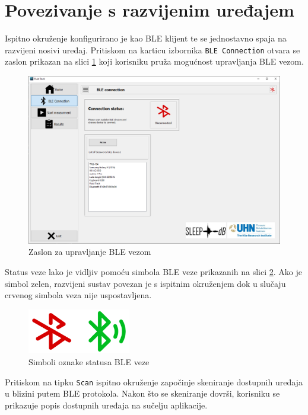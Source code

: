 \documentclass[../diplomski_rad.tex]{subfiles}
\begin{document}
\section{Povezivanje s razvijenim uređajem}

Ispitno okruženje konfigurirano je kao BLE klijent te se jednostavno spaja na razvijeni nosivi uređaj. 
Pritiskom na karticu izbornika \texttt{BLE Connection} otvara se zaslon prikazan na slici \ref{slk:ble} 
koji korisniku pruža mogućnost upravljanja BLE vezom.

\begin{figure}[htb]
    \centering
    \includegraphics[width=1\textwidth]{Figures/ble.png} 
    \caption{Zaslon za upravljanje BLE vezom}
    \label{slk:ble}
\end{figure}

Status veze lako je vidljiv pomoću simbola BLE veze prikazanih na slici \ref{slk:ble_status_simboli}.  
Ako je simbol zelen, razvijeni sustav povezan je s ispitnim okruženjem dok u slučaju crvenog simbola veza nije uspostavljena.

\begin{figure}[htb]
    \centering
    \includegraphics[width=0.4\textwidth]{Figures/ble_status_simboli.png} 
    \caption{Simboli oznake statusa BLE veze \cite{ikone}}
    \label{slk:ble_status_simboli}
\end{figure}

Pritiskom na tipku \texttt{Scan}  ispitno okruženje započinje skeniranje dostupnih uređaja 
u blizini putem BLE protokola. 
Nakon što se skeniranje dovrši, korisniku se prikazuje popis dostupnih uređaja na sučelju aplikacije.
\end{document}
